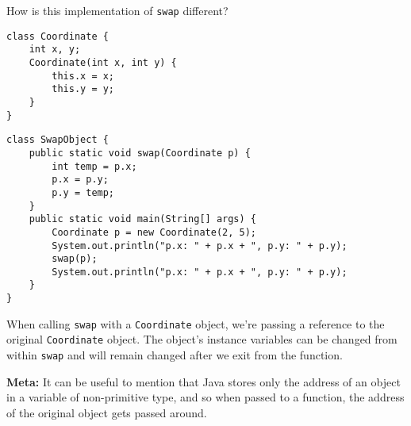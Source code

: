 \question How is this implementation of \texttt{swap} different?

\begin{lstlisting}
class Coordinate {
    int x, y;
    Coordinate(int x, int y) {
        this.x = x;
        this.y = y;
    }
}
\end{lstlisting}

\begin{lstlisting}
class SwapObject {
    public static void swap(Coordinate p) {
        int temp = p.x;
        p.x = p.y;
        p.y = temp;
    }
    public static void main(String[] args) {
        Coordinate p = new Coordinate(2, 5);
        System.out.println("p.x: " + p.x + ", p.y: " + p.y);
        swap(p);
        System.out.println("p.x: " + p.x + ", p.y: " + p.y);
    }
}
\end{lstlisting}

\begin{solution}
When calling \texttt{swap} with a \texttt{Coordinate} object, we're passing a reference to the original \texttt{Coordinate} object. The object's instance variables can be changed from within \texttt{swap} and will remain changed after we exit from the function.

\textbf{Meta:} It can be useful to mention that Java stores only the address of an object in a variable of non-primitive type, and so when passed to a function, the address of the original object gets passed around. 
\end{solution}
